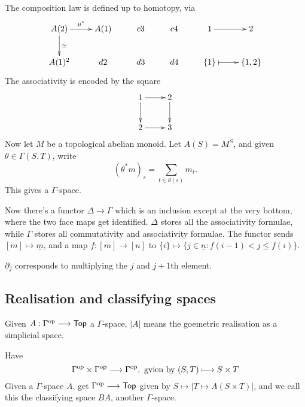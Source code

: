 \documentclass[11pt]{article}
\begin{document}
\begin{JandrGammaSpaces}
The composition law is defined up to homotopy, via
\[\xymatrix{
\ar[d]^{\simeq} A(2)\ar[r]^{\mu^*}& A(1)& c3& c4& 1\ar[r]& 2\\
 A(1)^2& d2& d3& d4& \{1\}\ar@{|->}[r]& \{1,2\}\\
}\]
The associativity is encoded by the square
\[\xymatrix{
 1\ar[d]\ar[r]&2\ar[d]\\
 2\ar[r]& 3
}\]
Now let $M$ be a topological abelian monoid. Let $A(S)=M^S$, and given $\theta\in\Gamma(S,T)$, write
\[(\theta^*m)_s=\sum_{t\in \theta(s)}m_t.\]
This gives a $\Gamma$-space.

Now there's a functor $\Delta\to\Gamma$ which is an inclusion except at the  very bottom, where the two face maps get identified. $\Delta$ stores all the associativity formulae, while $\Gamma$ stores all commutativity and associativity formulae. The functor sends
$[m]\mapsto \underline{m}$, and a map $f:[m]\to[n]$ to $\{i\}\mapsto \{j\in\underline{n}:f(i-1)<j\leq f(i)\}$.

$\partial_j$ corresponds to multiplying the $j$ and $j+1$th element.
\subsection*{Realisation and classifying spaces}
Given $A:\Gamma^{\textup{op}}\longrightarrow\operatorname{{\mathsf{Top}}}$ a $\Gamma$-space, $|A|$ means the goemetric realisation as a simplicial space.

Have
\[\Gamma^{\textup{op}}\times\Gamma^{\textup{op}}\longrightarrow\Gamma^{\textup{op}},\text{ gvien by }(S,T)\longmapsto S\times T\]
Given a $\Gamma$-space $A$, get $\Gamma^{\textup{op}}\longrightarrow\operatorname{{\mathsf{Top}}}$ given by $S \mapsto |T\mapsto A(S\times T)|$, and we call this the classifying space $BA$, another $\Gamma$-space.


\end{JandrGammaSpaces}
\end{document}
